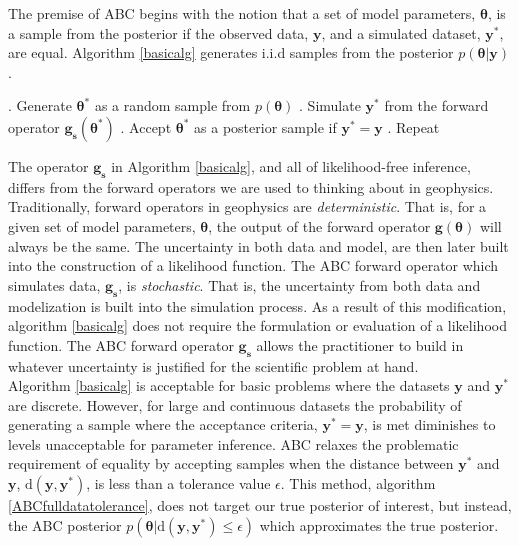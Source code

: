 The premise of ABC begins with the notion that a set of model parameters, $\bm{\theta}$, is a sample from the posterior if the observed data, $\bm{y}$, and a simulated dataset, $\bm{y^*}$, are equal. Algorithm \ref{basicalg} generates i.i.d samples from the posterior $p(\bm{\theta}|\bm{y})$.

\begin{algorithm}[H]
	\caption{ }
	\begin{algorithmic}
		. Generate $\bm{\theta^*}$ as a random sample from $p(\bm{\theta})$		
		. Simulate $\bm{y^*}$ from the forward operator $\bm{g_s}(\bm{\theta^*})$		
		. Accept $\bm{\theta^*}$ as a posterior sample if $\bm{y^*} = \bm{y}$		
		. Repeat
	\end{algorithmic}
	\label{basicalg}
\end{algorithm}

The operator $\bm{g_s}$ in Algorithm \ref{basicalg}, and all of likelihood-free inference, differs from the forward operators we are used to thinking about in geophysics. Traditionally, forward operators in geophysics are \textit{deterministic}. That is, for a given set of model parameters, $\bm{\theta}$, the output of the forward operator $\bm{g}(\bm{\theta})$ will always be the same. The uncertainty in both data and model, are then later built into the construction of a likelihood function. The ABC forward operator which simulates data, $\bm{g_s}$, is \textit{stochastic}. That is, the uncertainty from both data and modelization is built into the simulation process. As a result of this modification, algorithm \ref{basicalg} does not require the formulation or evaluation of a likelihood function. The ABC forward operator $\bm{g_s}$ allows the practitioner to build in whatever uncertainty is justified for the scientific problem at hand.\\

Algorithm \ref{basicalg} is acceptable for basic problems where the datasets $\bm{y}$ and $\bm{y^*}$ are discrete. However, for large and continuous datasets the probability of generating a sample where the acceptance criteria, $\bm{y^*} = \bm{y}$, is met diminishes to levels unacceptable for parameter inference. ABC relaxes the problematic requirement of equality by accepting samples when the distance between $\bm{y^*}$ and $\bm{y}$, $\text{d}(\bm{y},\bm{y^*})$, is less than a tolerance value $\epsilon$. This method, algorithm \ref{ABCfulldatatolerance}, does not target our true posterior of interest, but instead, the ABC posterior $p(\bm{\theta}|\text{d}(\bm{y},\bm{y^*})\leq\epsilon)$ which approximates the true posterior. 

